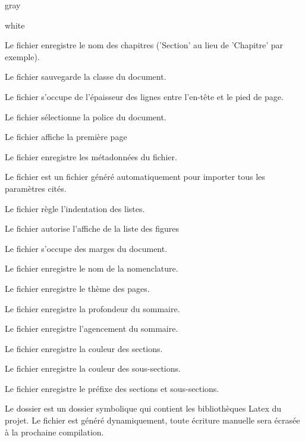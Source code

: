 {\begin{items}{gray}{\faFolder}
\begin{items}{white}{}
        \item Le fichier  enregistre le nom des chapitres ('Section' au lieu de 'Chapitre' par exemple).
        \item Le fichier  sauvegarde la classe du document.
        \item Le fichier  s'occupe de l'épaisseur des lignes entre l'en-tête et le pied de page.
        \item Le fichier  sélectionne la police du document.
        \item Le fichier  affiche la première page
        \item Le fichier  enregistre les métadonnées du fichier.
        \item Le fichier  est un fichier généré automatiquement pour importer tous les paramètres cités.
        \item Le fichier  règle l'indentation des listes.
        \item Le fichier  autorise l'affiche de la liste des figures
        \item Le fichier  s'occupe des marges du document.
        \item Le fichier  enregistre le nom de la nomenclature.
        \item Le fichier  enregistre le thème des pages.
        \item Le fichier  enregistre la profondeur du sommaire.
        \item Le fichier  enregistre l'agencement du sommaire.
        \item Le fichier  enregistre la couleur des sections.
        \item Le fichier  enregistre la couleur des sous-sections.
        \item Le fichier  enregistre le préfixe des sections et sous-sections.

    \end{items}
    \item Le dossier  est un dossier symbolique qui contient les bibliothèques Latex du projet. Le fichier  est généré 
    dynamiquement, toute écriture manuelle sera écrasée à la prochaine compilation.


\end{items}}
